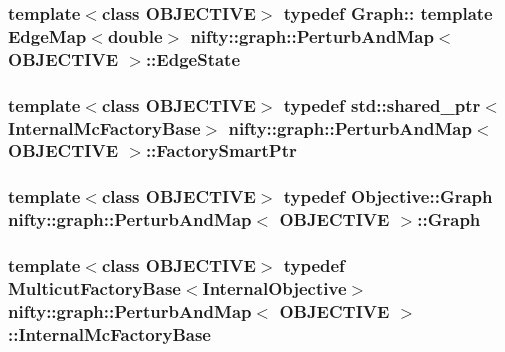 \subsubsection[{Edge\+State}]{\setlength{\rightskip}{0pt plus 5cm}template$<$class O\+B\+J\+E\+C\+T\+I\+V\+E$>$ typedef Graph\+:: template Edge\+Map$<$double$>$ {\bf nifty\+::graph\+::\+Perturb\+And\+Map}$<$ O\+B\+J\+E\+C\+T\+I\+V\+E $>$\+::{\bf Edge\+State}}\label{classnifty_1_1graph_1_1PerturbAndMap_aecae76ea82e2ee66c5f8186132c88a5c}
\hypertarget{classnifty_1_1graph_1_1PerturbAndMap_a815db966f32373a375bb54709027997b}{}
\subsubsection[{Factory\+Smart\+Ptr}]{\setlength{\rightskip}{0pt plus 5cm}template$<$class O\+B\+J\+E\+C\+T\+I\+V\+E$>$ typedef std\+::shared\+\_\+ptr$<${\bf Internal\+Mc\+Factory\+Base}$>$ {\bf nifty\+::graph\+::\+Perturb\+And\+Map}$<$ O\+B\+J\+E\+C\+T\+I\+V\+E $>$\+::{\bf Factory\+Smart\+Ptr}}\label{classnifty_1_1graph_1_1PerturbAndMap_a815db966f32373a375bb54709027997b}
\hypertarget{classnifty_1_1graph_1_1PerturbAndMap_a8c74ad131238a83d5abfdf99e726f00f}{}
\subsubsection[{Graph}]{\setlength{\rightskip}{0pt plus 5cm}template$<$class O\+B\+J\+E\+C\+T\+I\+V\+E$>$ typedef Objective\+::\+Graph {\bf nifty\+::graph\+::\+Perturb\+And\+Map}$<$ O\+B\+J\+E\+C\+T\+I\+V\+E $>$\+::{\bf Graph}}\label{classnifty_1_1graph_1_1PerturbAndMap_a8c74ad131238a83d5abfdf99e726f00f}
\hypertarget{classnifty_1_1graph_1_1PerturbAndMap_a8feaddb2d6ce39525544faf3a5a9dff9}{}
\subsubsection[{Internal\+Mc\+Factory\+Base}]{\setlength{\rightskip}{0pt plus 5cm}template$<$class O\+B\+J\+E\+C\+T\+I\+V\+E$>$ typedef {\bf Multicut\+Factory\+Base}$<${\bf Internal\+Objective}$>$ {\bf nifty\+::graph\+::\+Perturb\+And\+Map}$<$ O\+B\+J\+E\+C\+T\+I\+V\+E $>$\+::{\bf Internal\+Mc\+Factory\+Base}}\label{classnifty_1_1graph_1_1PerturbAndMap_a8feaddb2d6ce39525544faf3a5a9dff9}
\hypertarget{classnifty_1_1graph_1_1PerturbAndMap_a30b65b32da50e2c0cc369e3942dd15ff}{}
